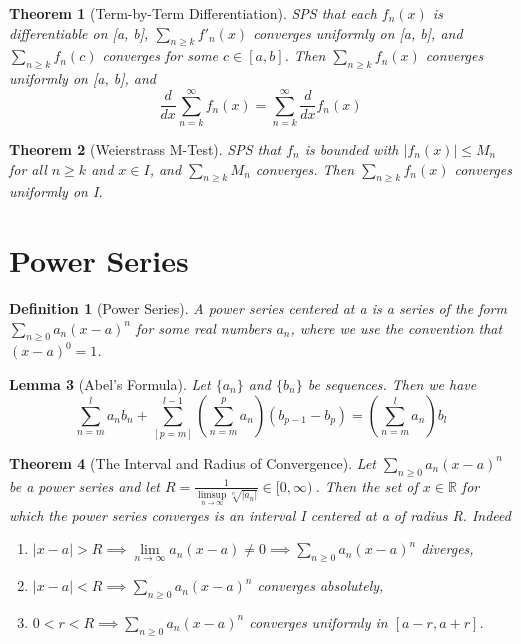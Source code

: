 \documentclass[11pt, oneside]{book}
\theoremstyle{break}
\newtheorem{thm}{Theorem}[section]
\newtheorem{lemma}[thm]{Lemma}
\newtheorem{defn}{Definition}[section]
\newcommand{\bb}[1]{\mathbb{#1}}			%
\begin{document}
\begin{thm}[Term-by-Term Differentiation]
	SPS that each $f_n(x)$ is differentiable on [a, b], $\sum_{n \geq k} f'_n(x)$ converges uniformly on [a, b], and $\sum_{n \geq k} f_n(c)$ converges for some $c \in [a, b]$. Then $\sum_{n \geq k} f_n(x)$ converges uniformly on [a, b], and
	\[
		\frac{d}{dx} \sum_{n = k}^{\infty} f_n(x) = \sum_{n = k}^{\infty} \frac{d}{dx} f_n(x)
	\]
\end{thm}

\begin{thm}[Weierstrass M-Test]
	SPS that $f_n$ is bounded with $|f_n(x)| \leq M_n$ for all $n \geq k$ and $x \in I$, and $\sum_{n \geq k} M_n$ converges. Then $\sum_{n \geq k} f_n(x)$ converges uniformly on I.
\end{thm}


\section{Power Series}
\begin{defn}[Power Series]
	A power series centered at a is a series of the form $\sum\limits_{n \geq 0} a_n (x - a)^n$ for some real numbers $a_n$, where we use the convention that $(x - a)^0 = 1$.
\end{defn}

\begin{lemma}[Abel's Formula]
	Let $\{a_n\}$ and $\{b_n\}$ be sequences. Then we have
	\[
		\sum_{n = m}^{l} a_n b_n + \sum_{[p = m]}^{l - 1} \left( \sum_{n = m}^{p} a_n \right) (b_{p -1} - b_p) = \left(\sum_{n = m}^{l} a_n \right) b_l
	\]
\end{lemma}

\begin{thm}[The Interval and Radius of Convergence]
	Let $\sum\limits_{n \geq 0} a_n (x - a)^n$ be a power series and let $R = \frac{1}{ \limsup\limits_{n \to \infty} \sqrt[n]{|a_n|} } \in [0, \infty)\ $. Then the set of $x \in \bb{R}$ for which the power series converges is an interval I centered at a of radius R. Indeed
	\begin{enumerate}
		\item $|x - a| > R \implies \lim\limits_{n \to \infty} a_n (x - a) \neq 0 \implies \sum\limits_{n \geq 0} a_n (x - a)^n$ diverges,
		\item $|x - a| < R \implies \sum\limits_{n \geq 0} a_n (x - a)^n$ converges absolutely,
		\item $0 < r < R \implies \sum\limits_{n \geq 0} a_n (x - a)^n$ converges uniformly in $[a - r, a + r]$.
	\end{enumerate}
\end{thm}
\end{document}
